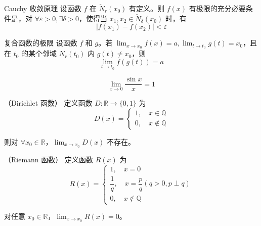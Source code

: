 \begin{theorem}{Cauchy 收敛原理}
    设函数 $f$ 在 $\check{N}_{r}(x_0)$ 有定义。则 $f(x)$ 有极限的充分必要条件是，对 $\forall \varepsilon > 0, \exists \delta > 0$，使得当 $x_1, x_2 \in \check{N}_{\delta}(x_0)$ 时，有
    \[|f(x_1) - f(x_2)| < \varepsilon\]
\end{theorem}

\begin{theorem}{复合函数的极限}
    设函数 $f$ 和 $g$。若 $\displaystyle \lim_{x \to x_0}f(x) = a, \lim_{t \to t_0}g(t) = x_0$，且在 $t_0$ 的某个邻域 $N_r(t_0)$ 内 $g(t) \neq x_0$，则
    \[\lim_{t \to t_0}f(g(t)) = a\]
\end{theorem}

\hfill

\begin{example}
    \[\lim_{x \to 0}\frac{\sin x}{x} = 1\]
\end{example}

\hfill

\begin{example}{（Dirichlet 函数）}
    定义函数 $D: \mathbb{R} \to \{ 0, 1 \}$ 为
    \[
        D(x) = \begin{cases}
            1,\quad x \in \mathbb{Q} \\
            0,\quad x \notin \mathbb{Q}
        \end{cases}
    \]

    则对 $\forall x_0 \in \mathbb{R}$，$\displaystyle \lim_{x \to x_0}D(x)$ 不存在。
\end{example}

\hfill

\begin{example}{（Riemann 函数）}
    定义函数 $R(x)$ 为
    \[
        R(x) = \begin{cases}
            1,\quad x = 0                                         \\
            \dfrac{1}{q},\quad x = \dfrac{p}{q}(q > 0, p \perp q) \\
            0,\quad x \notin \mathbb{Q}
        \end{cases}
    \]

    对任意 $x_0 \in \mathbb{R}$，$\displaystyle \lim_{x \to x_0}R(x) = 0$。
\end{example}


